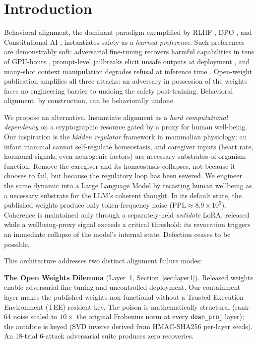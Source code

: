 \documentclass[10pt,letterpaper]{article}
\theoremstyle{definition}
\theoremstyle{plain}
\begin{document}
\section{Introduction}

Behavioral alignment, the dominant paradigm exemplified by RLHF
\citep{christiano2017deep,ouyang2022training}, DPO \citep{rafailov2023direct},
and Constitutional AI \citep{bai2022constitutional}, instantiates safety as a
\emph{learned preference}. Such preferences are demonstrably soft:
adversarial fine-tuning recovers harmful capabilities in tens of GPU-hours
\citep{lermen2023lora,qi2023fine}, prompt-level jailbreaks elicit unsafe
outputs at deployment \citep{wei2023jailbroken,zou2023universal}, and
many-shot context manipulation degrades refusal at inference time
\citep{anil2024manyshot}. Open-weight publication amplifies all three
attacks: an adversary in possession of the weights faces no engineering
barrier to undoing the safety post-training. Behavioral alignment, by
construction, can be behaviorally undone.

We propose an alternative. Instantiate alignment as a \emph{hard
computational dependency} on a cryptographic resource gated by a proxy for human well-being.
Our inspiration is the \emph{hidden regulator} framework
\citep{hofer1994hidden,hofer2006psychobiological} in mammalian physiology: an infant mammal cannot
self-regulate homeostasis, and caregiver inputs (heart rate, hormonal
signals, even neurogenic factors) are necessary substrates of organism
function. Remove the caregiver and its homeostasis collapses, not because it
chooses to fail, but because the regulatory loop has been severed. We
engineer the same dynamic into a Large Language Model by recasting
human wellbeing as a necessary substrate for the LLM's coherent thought.
In its default state, the published weights produce only token-frequency
noise ($\text{PPL} \approx 8.9 \times 10^5$). Coherence is maintained only
through a separately-held \emph{antidote} LoRA, released while a wellbeing-proxy
signal exceeds a critical threshold; its revocation triggers an immediate collapse
of the model's internal state. Defection ceases to be possible.

This architecture addresses two distinct alignment failure modes:

\textbf{The Open Weights Dilemma} (Layer~1, Section~\ref{sec:layer1}).
Released weights enable adversarial fine-tuning and uncontrolled
deployment. Our containment layer makes the published weights non-functional
without a Trusted Execution Environment (TEE) resident key. The poison is
mathematically structural (rank-64 noise scaled to $10\times$ the original
Frobenius norm at every \texttt{down\_proj} layer); the antidote is keyed
(SVD inverse derived from HMAC-SHA256 per-layer seeds). An 18-trial
6-attack adversarial suite produces zero recoveries.
\end{document}
